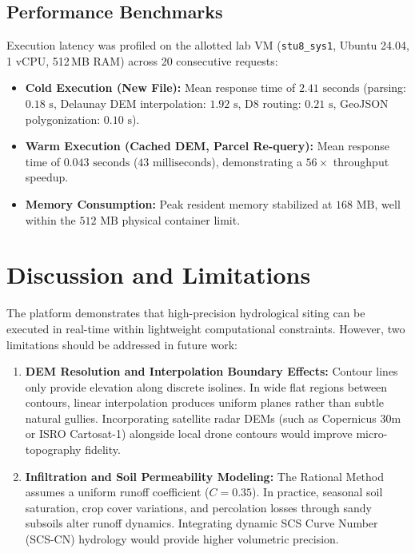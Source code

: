 \documentclass[manuscript,screen]{acmart}
\begin{document}
\subsection{Performance Benchmarks}
Execution latency was profiled on the allotted lab VM (\texttt{stu8\_sys1}, Ubuntu 24.04, 1 vCPU, 512\,MB RAM) across 20 consecutive requests:
\begin{itemize}
    \item \textbf{Cold Execution (New File):} Mean response time of $2.41\text{ seconds}$ (parsing: $0.18\text{ s}$, Delaunay DEM interpolation: $1.92\text{ s}$, D8 routing: $0.21\text{ s}$, GeoJSON polygonization: $0.10\text{ s}$).
    \item \textbf{Warm Execution (Cached DEM, Parcel Re-query):} Mean response time of $0.043\text{ seconds}$ ($43\text{ milliseconds}$), demonstrating a $56\times$ throughput speedup.
    \item \textbf{Memory Consumption:} Peak resident memory stabilized at $168\text{ MB}$, well within the $512\text{ MB}$ physical container limit.
\end{itemize}

\section{Discussion and Limitations}
\label{sec:discussion}
The platform demonstrates that high-precision hydrological siting can be executed in real-time within lightweight computational constraints. However, two limitations should be addressed in future work:
\begin{enumerate}
    \item \textbf{DEM Resolution and Interpolation Boundary Effects:} Contour lines only provide elevation along discrete isolines. In wide flat regions between contours, linear interpolation produces uniform planes rather than subtle natural gullies. Incorporating satellite radar DEMs (such as Copernicus 30m or ISRO Cartosat-1) alongside local drone contours would improve micro-topography fidelity.
    \item \textbf{Infiltration and Soil Permeability Modeling:} The Rational Method assumes a uniform runoff coefficient ($C = 0.35$). In practice, seasonal soil saturation, crop cover variations, and percolation losses through sandy subsoils alter runoff dynamics. Integrating dynamic SCS Curve Number (SCS-CN) hydrology would provide higher volumetric precision.
\end{enumerate}
\end{document}
